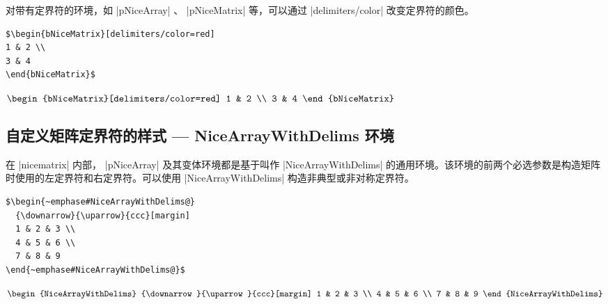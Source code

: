 \documentclass[dvipsnames]{article}%
\begin{document}
对带有定界符的环境，如 |{pNiceArray}| 、 |{pNiceMatrix}| 等，可以通过 |delimiters/color| 改变定界符的颜色。

\bigskip
\begin{BVerbatim}[boxwidth=12cm,baseline=c]
$\begin{bNiceMatrix}[delimiters/color=red]
1 & 2 \\
3 & 4 
\end{bNiceMatrix}$
\end{BVerbatim}
$\begin{bNiceMatrix}[delimiters/color=red]
1 & 2 \\
3 & 4 
\end{bNiceMatrix}$


\subsection{自定义矩阵定界符的样式 --- NiceArrayWithDelims 环境}
\label{zm:非对称定界符}

在 |nicematrix| 内部， |{pNiceArray}| 及其变体环境都是基于叫作 |{NiceArrayWithDelims}| 的通用环境。该环境的前两个必选参数是构造矩阵时使用的左定界符和右定界符。可以使用 |{NiceArrayWithDelims}| 构造非典型或非对称定界符。

\bigskip
\begin{BVerbatim}[baseline=c,boxwidth=11cm]
$\begin{~emphase#NiceArrayWithDelims@}
  {\downarrow}{\uparrow}{ccc}[margin]
  1 & 2 & 3 \\
  4 & 5 & 6 \\
  7 & 8 & 9 
\end{~emphase#NiceArrayWithDelims@}$
\end{BVerbatim}
$\begin{NiceArrayWithDelims}
  {\downarrow}{\uparrow}{ccc}[margin]
  1 & 2 & 3 \\
  4 & 5 & 6 \\
  7 & 8 & 9 
\end{NiceArrayWithDelims}$
\end{document}
